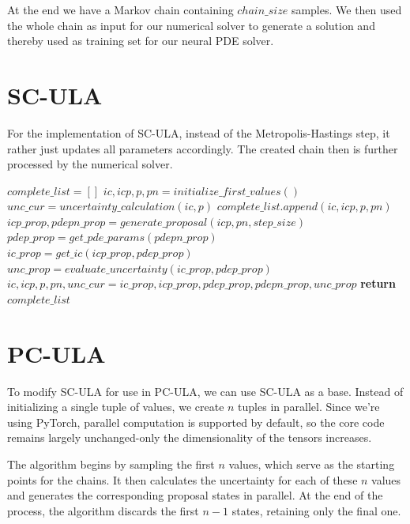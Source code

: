 At the end we have a Markov chain containing $chain\_size$ samples. We then used the whole chain as input for our numerical solver to generate a solution and thereby 
used as training set for our neural PDE solver. 

\section{SC-ULA}
For the implementation of SC-ULA, instead of the Metropolis-Hastings step, it rather just updates all parameters accordingly. The created chain then is further processed by the numerical solver.
\begin{Algorithmus}
    \caption{Pseudocode for SC-ULA}
    \label{alg:SC-ULA}
    \begin{algorithmic}[1] 
            \State $complete\_list = []$
            \State $ic, icp, p, pn = initialize\_first\_values()$
            \State $unc\_cur = uncertainty\_calculation(ic, p)$
            \State $complete\_list.append(ic, icp, p, pn)$
            \State $icp\_prop, pdepn\_prop = generate\_proposal(icp, pn, step\_size)$
            \State $pdep\_prop = get\_pde\_params(pdepn\_prop)$
            \State $ic\_prop = get\_ic(icp\_prop, pdep\_prop)$
            \State $unc\_prop = evaluate\_uncertainty(ic\_prop, pdep\_prop)$
            \State $ic, icp, p, pn, unc\_cur = ic\_prop, icp\_prop, pdep\_prop,  pdepn\_prop, unc\_prop$
            \EndFor
        \State \textbf{return } $complete\_list$
        \EndFunction
    \end{algorithmic}
\end{Algorithmus}

\section{PC-ULA}
To modify SC-ULA for use in PC-ULA, we can use SC-ULA as a base. Instead of initializing a single tuple of values, we create $n$ tuples in parallel. Since we're using PyTorch, parallel computation is supported by default, so the core code remains largely unchanged-only the dimensionality of the tensors increases.

The algorithm begins by sampling the first $n$ values, which serve as the starting points for the chains. It then calculates the uncertainty for each of these $n$ values and generates the corresponding proposal states in parallel. At the end of the process, the algorithm discards the first $n - 1$ states, retaining only the final one.

